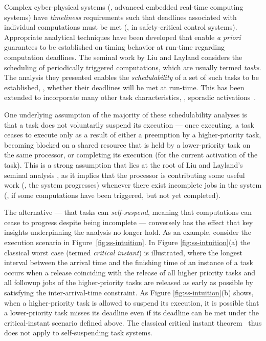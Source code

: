
Complex cyber-physical systems (\ie, advanced embedded real-time computing systems) have \emph{timeliness} requirements %
such that  deadlines associated with individual computations must be met (\eg, in safety-critical control systems). Appropriate analytical techniques have been developed that enable \emph{a priori} guarantees to be established on timing behavior at run-time regarding computation deadlines.  
The seminal work by Liu and Layland \cite{Liu_1973} considers the scheduling of periodically triggered computations, which are usually termed \emph{tasks}. 
The analysis they presented enables the \emph{schedulability} of a set of such tasks to be established, \ie, whether their deadlines will be met at run-time. This has been extended to incorporate many other task characteristics, \eg, sporadic activations~\cite{Mok:1983:FDP:888951}. 

One underlying assumption of the majority of these schedulability analyses is that a task does not voluntarily suspend its execution --- once executing, a task ceases to execute only as a result of either a preemption by a higher-priority task, becoming blocked on a shared resource that is held by a lower-priority task on the same processor, or completing its execution (for the current activation of the task). This is a strong assumption that lies at the root of Liu and Layland's seminal analysis \cite{Liu_1973}, as it implies that the processor is contributing some useful work (\ie, the system progresses) whenever there exist incomplete jobs in the system (\ie, if some computations have been triggered, but not yet completed). 

The alternative --- that tasks can \emph{self-suspend}, meaning that computations can cease to progress despite being incomplete --- conversely has the effect that key insights underpinning the analysis no longer hold. As an example, consider the execution scenario in Figure~\ref{fig:ss-intuition}. In Figure \ref{fig:ss-intuition}(a) the classical worst case (termed \emph{critical instant}) is illustrated, where the longest interval between the arrival time and the finishing time of an instance of a task occurs when a release coinciding with the release of all higher priority tasks and all followup jobs of the higher-priority tasks are released as early as possible by satisfying the inter-arrival-time constraint. As Figure \ref{fig:ss-intuition}(b) shows, when a higher-priority task is allowed to suspend its execution, it is possible that a lower-priority task misses its deadline even if its deadline can be met under the critical-instant scenario defined above. The classical critical instant theorem~\cite{Liu_1973} thus does not apply to self-suspending task systems.


